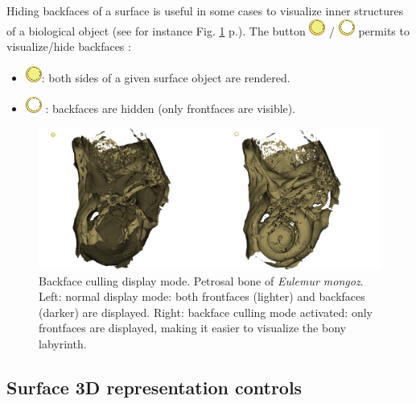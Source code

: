 Hiding backfaces of a surface is useful in some cases to visualize inner structures of a biological object (see for instance Fig. \ref{backface_example} p.\pageref{backface_example}). The button \includegraphics[scale=0.7]{images/06/display/backface_on.png} / \includegraphics[scale=0.7]{images/06/display/backface_off.png}  permits to visualize/hide backfaces :
\begin{itemize}
\item  \includegraphics[scale=0.7]{images/06/display/backface_on.png}: both sides of a given surface object are rendered.
\item	\includegraphics[scale=0.7]{images/06/display/backface_off.png} : backfaces are hidden (only frontfaces are visible).

\end{itemize}


\begin{figure}
  \centering
  \includegraphics[scale=0.3]{images/06/display/backface_example.png} 
	\caption{Backface culling display mode. Petrosal bone of \textit{Eulemur mongoz}. Left: normal display mode: both frontfaces (lighter) and backfaces (darker) are displayed. Right: backface culling mode activated: only frontfaces are displayed, making it easier to visualize the bony labyrinth. }
\label{backface_example}
 
\end{figure}



\subsection{Surface 3D representation controls}


